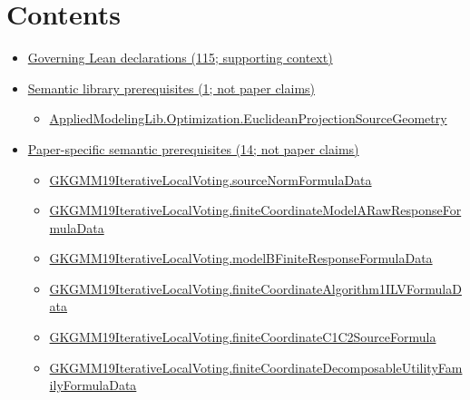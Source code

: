 \documentclass[10pt]{article}
\begin{document}
\section*{Contents}
\begin{itemize}[leftmargin=1.2em]
\item \hyperlink{governing-declaration-section-5ef5ef0364b6939c}{Governing Lean declarations (115; supporting context)}
\item \hyperlink{library-section-7af9edee67c68478}{Semantic library prerequisites (1; not paper claims)}
\begin{itemize}[leftmargin=1.2em]
\item \hyperlink{library-prerequisite-dee93285823cfb6a}{Applied\allowbreak{}Modeling\allowbreak{}Lib.\allowbreak{}Optimization.\allowbreak{}Euclidean\allowbreak{}Projection\allowbreak{}Source\allowbreak{}Geometry}
\end{itemize}
\item \hyperlink{paper-prerequisite-section-5ef5ef0364b6939c}{Paper-specific semantic prerequisites (14; not paper claims)}
\begin{itemize}[leftmargin=1.2em]
\item \hyperlink{paper-prerequisite-d7774e2d1adfed0f}{GKGMM19\allowbreak{}Iterative\allowbreak{}Local\allowbreak{}Voting.\allowbreak{}source\allowbreak{}Norm\allowbreak{}Formula\allowbreak{}Data}
\item \hyperlink{paper-prerequisite-a8134359178155da}{GKGMM19\allowbreak{}Iterative\allowbreak{}Local\allowbreak{}Voting.\allowbreak{}finite\allowbreak{}Coordinate\allowbreak{}Model\allowbreak{}A\allowbreak{}Raw\allowbreak{}Response\allowbreak{}Formula\allowbreak{}Data}
\item \hyperlink{paper-prerequisite-9418c34a2afc37e8}{GKGMM19\allowbreak{}Iterative\allowbreak{}Local\allowbreak{}Voting.\allowbreak{}model\allowbreak{}B\allowbreak{}Finite\allowbreak{}Response\allowbreak{}Formula\allowbreak{}Data}
\item \hyperlink{paper-prerequisite-4b666244f118aa8c}{GKGMM19\allowbreak{}Iterative\allowbreak{}Local\allowbreak{}Voting.\allowbreak{}finite\allowbreak{}Coordinate\allowbreak{}Algorithm1\allowbreak{}ILV\allowbreak{}Formula\allowbreak{}Data}
\item \hyperlink{paper-prerequisite-32c3bd932a95ca6f}{GKGMM19\allowbreak{}Iterative\allowbreak{}Local\allowbreak{}Voting.\allowbreak{}finite\allowbreak{}Coordinate\allowbreak{}C1\allowbreak{}C2\allowbreak{}Source\allowbreak{}Formula}
\item \hyperlink{paper-prerequisite-b993828491958a04}{GKGMM19\allowbreak{}Iterative\allowbreak{}Local\allowbreak{}Voting.\allowbreak{}finite\allowbreak{}Coordinate\allowbreak{}Decomposable\allowbreak{}Utility\allowbreak{}Family\allowbreak{}Formula\allowbreak{}Data}

\end{itemize}
\end{itemize}
\end{document}
